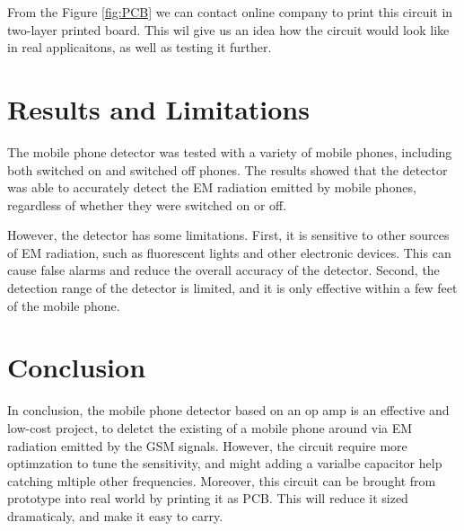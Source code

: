 \documentclass[a4paper, 11pt]{report}
\begin{document}
From the Figure \ref{fig:PCB} we can contact online company to print this circuit in two-layer printed board.
This wil give us an idea how the circuit would look like in real applicaitons, as well as testing it further.



\section{Results and Limitations}

The mobile phone detector was tested with a variety of mobile phones, including both switched on and switched off phones. The results showed that the detector was able to accurately detect the EM radiation emitted by mobile phones, regardless of whether they were switched on or off.

However, the detector has some limitations. First, it is sensitive to other sources of EM radiation, such as fluorescent lights and other electronic devices. This can cause false alarms and reduce the overall accuracy of the detector. Second, the detection range of the detector is limited, and it is only effective within a few feet of the mobile phone.

\section{Conclusion}

In conclusion, the mobile phone detector based on an op amp is an effective and low-cost project, to deletct
the existing of a mobile phone around via EM radiation emitted by the GSM signals. However, the circuit require
more optimzation to tune the sensitivity, and might adding a varialbe capacitor help catching mltiple
other frequencies. Moreover, this circuit can be brought from prototype into real world by printing it as
PCB. This will reduce it sized dramaticaly, and make it easy to carry.
\end{document}
